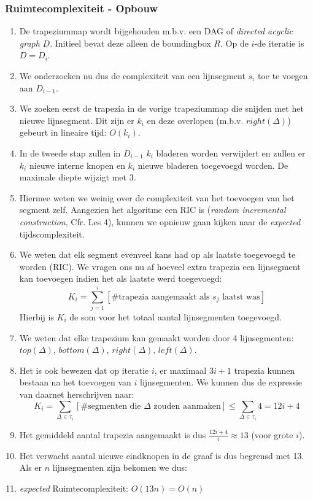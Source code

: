 \documentclass[12pt,a4paper]{article}
\begin{document}
			\subsubsection{Ruimtecomplexiteit - Opbouw}
				\begin{enumerate}
					\item De trapeziummap wordt bijgehouden m.b.v. een DAG of \emph{directed acyclic graph} $D$. Initieel bevat deze alleen de boundingbox $R$. Op de $i$-de iteratie is $D = D_i$.
					\item We onderzoeken nu dus de complexiteit van een lijnsegment $s_i$ toe te voegen aan $D_{i-1}$.
					\item We zoeken eerst de trapezia in de vorige trapeziummap die snijden met het nieuwe lijnsegment. Dit zijn er $k_i$ en deze overlopen (m.b.v. $right(\Delta)$) gebeurt in lineaire tijd: $O(k_i)$. 
					\item In de tweede stap zullen in $D_{i-1}$ $k_i$ bladeren worden verwijdert en zullen er $k_i$ nieuwe interne knopen en $k_i$ nieuwe bladeren toegevoegd worden. De maximale diepte wijzigt met $3$. 
					\item Hiermee weten we weinig over de complexiteit van het toevoegen van het segment zelf. Aangezien het algoritme een RIC is (\emph{random incremental construction}, Cfr. Les 4), kunnen we opnieuw gaan kijken naar de \emph{expected} tijdscomplexiteit. 
					\item We weten dat elk segment evenveel kans had op als laatste toegevoegd te worden (RIC). We  vragen ons nu af hoeveel extra trapezia een lijnsegment kan toevoegen indien het als laatste werd toegevoegd:
					$$K_i = \sum_{j=1}^{i}[\#\textrm{trapezia aangemaakt als $s_j$ laatst was}]$$
					Hierbij is $K_i$ de som voor het totaal aantal lijnsegmenten toegevoegd.
					\item We weten dat elke trapezium kan gemaakt worden door 4 lijnsegmenten: $top(\Delta)$, $bottom(\Delta)$, $right(\Delta)$, $left(\Delta)$.
					\item Het is ook bewezen dat op iteratie $i$, er maximaal $3i + 1$ trapezia kunnen bestaan na het toevoegen van $i$ lijnsegmenten. We kunnen dus de expressie van daarnet herschrijven naar:
					$$K_i = \sum_{\Delta \in \tau_i}[\#\textrm{segmenten die $\Delta$ zouden aanmaken}] \leq \sum_{\Delta \in \tau_i}4 = 12i + 4$$
					\item Het gemiddeld aantal trapezia aangemaakt is dus $\frac{12i + 4}{i} \approx 13$ (voor grote $i$).
					\item Het verwacht aantal nieuwe eindknopen in de graaf is dus begrensd met 13. Als er $n$ lijnsegmenten zijn bekomen we dus:
					\item \emph{expected} Ruimtecomplexiteit: $O(13n) = O(n)$
				\end{enumerate}
		
\end{document}
